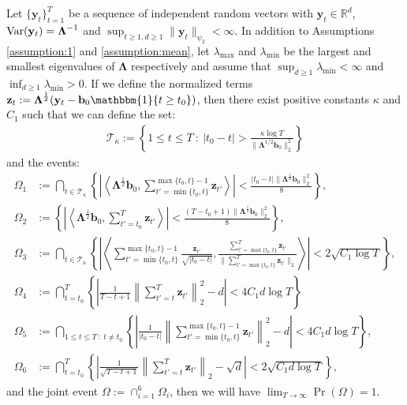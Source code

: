 \begin{lemma}\label{lemma:thm1-event-bound}

Let $\{\mathbf{y}_t\}_{t=1}^T$ be a sequence of independent random vectors with $\mathbf{y}_t \in \mathbb{R}^d$, $\normalfont{\text{\normalfont Var}}(\mathbf{y}_t) = \boldsymbol{\Lambda}^{-1}$ and $\sup_{t\geq 1, d\geq 1} \lVert \mathbf{y}_t\rVert_{\psi_2} < \infty$. In addition to Assumptions \ref{assumption:1} and \ref{assumption:mean}, let $\lambda_{\max}$ and $\lambda_{\min}$ be the largest and smallest eigenvalues of $\boldsymbol{\Lambda}$ respectively and assume that $\sup_{d\geq 1} \lambda_{\min} < \infty$ and $\inf_{d\geq 1} \lambda_{\min} > 0$. If we define the normalized terms $\mathbf{z}_t := \boldsymbol{\Lambda}^{\frac{1}{2}}(\mathbf{y}_t - \mathbf{b}_0\mathbbm{1}\{t\geq t_0\})$, then there exist positive constants $\kappa$ and $C_1$ such that we can define the set:
\begin{align*}
    \mathcal{T}_{\kappa} := \left\{1\leq t \leq T\::\:|t_0 - t| > \frac{\kappa \log T}{\lVert \boldsymbol{\Lambda}^{1/2}\mathbf{b}_0\rVert_2^2}\right\}
\end{align*}
and the events:
\begin{align*}
    \Omega_1 &:= \bigcap_{t \in \mathcal{T}_{\kappa} } \left\{ 
    \left|\left\langle\boldsymbol{\Lambda}^{\frac{1}{2}}\mathbf{b}_0, \sum_{t'=\min\{t_0,t\}}^{\max\{t_0,t\}-1}\mathbf{z}_{t'} \right\rangle\right| < \frac{|t_0-t| \lVert\boldsymbol{\Lambda}^{\frac{1}{2}} \mathbf{b}_0\rVert_2^2}{8}\right\}, \\
    \Omega_2 &:= \left\{\left|\left\langle \boldsymbol{\Lambda}^{\frac{1}{2}}\mathbf{b}_0, \sum_{t'=t_0}^T\mathbf{z}_{t'}\right\rangle\right| < \frac{(T-t_0+1) \lVert\boldsymbol{\Lambda}^{\frac{1}{2}} \mathbf{b}_0\rVert_2^2}{8} \right\}, \\
    \Omega_3 &:=  \bigcap_{t \in \mathcal{T}_{\kappa}} \left\{\left|\left\langle \sum_{t'=\min\{t_0,t\}}^{\max\{t_0,t\}-1}\frac{\mathbf{z}_{t'}}{\sqrt{|t_0-t|}}, \frac{\sum_{t'=\max\{t_0,t\}}^{T}\mathbf{z}_{t'}}{\lVert\sum_{t'=\max\{t_0,t\}}^{T}\mathbf{z}_{t'}\rVert_2}\right\rangle\right| < 2\sqrt{C_1\log T}\right\}, \\
    \Omega_4 &:=\bigcap_{t = t_0}^T \left\{\left|\frac{1}{T-t+1}\left\lVert\sum_{t'=t}^T \mathbf{z}_{t'}\right\rVert_2^2 -d \right| < 4 C_1 d \log T \right\} \\
    \Omega_5 &:= \bigcap_{1\leq t\leq T\::\:  t \neq t_0} \left\{\left|\frac{1}{|t_0 - t|}\left\lVert\sum_{t'=\min\{t_0,t\}}^{\max\{t_0,t\}-1} \mathbf{z}_{t'}\right\rVert_2^2 -d \right| < 4 C_1 d \log T \right\}, \\
    \Omega_6 &:= \bigcap_{t = t_0}^T \left\{\left|\frac{1}{\sqrt{T-t+1}}\left\lVert\sum_{t'=t}^T \mathbf{z}_{t'}\right\rVert_2 -\sqrt{d} \right| < 2\sqrt{C_1d \log T} \right\},
\end{align*}
and the joint event $\Omega := \cap_{i=1}^6 \Omega_i$, then we will have $\lim_{T\to\infty} \Pr(\Omega) = 1$.

\end{lemma}

